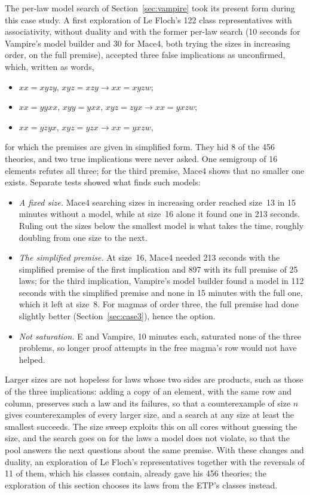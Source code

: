 \documentclass[11pt,a4paper]{article}
\theoremstyle{definition}
\theoremstyle{remark}
\begin{document}
The per-law model search of Section~\ref{sec:vampire} took its present form during this case study. A first exploration of Le Floch's 122 class representatives with associativity, without duality and with the former per-law search (10 seconds for Vampire's model builder and 30 for Mace4, both trying the sizes in increasing order, on the full premise), accepted three false implications as unconfirmed, which, written as words,
\begin{itemize}
  \item $xx = xyzy$, $xyz = xzy \to xx = xyzw$;
  \item $xx = yyxx$, $xyy = yxx$, $xyz = zyx \to xx = yxzw$;
  \item $xx = yzyx$, $xyz = yzx \to xx = yxzw$,
\end{itemize}
for which the premises are given in simplified form. They hid 8 of the 456 theories, and two true implications were never asked. One semigroup of 16 elements refutes all three; for the third premise, Mace4 shows that no smaller one exists. Separate tests showed what finds such models:
\begin{itemize}
  \item \emph{A fixed size.} Mace4 searching sizes in increasing order reached size~13 in 15 minutes without a model, while at size~16 alone it found one in 213 seconds. Ruling out the sizes below the smallest model is what takes the time, roughly doubling from one size to the next.
  \item \emph{The simplified premise.} At size~16, Mace4 needed 213 seconds with the simplified premise of the first implication and 897 with its full premise of 25 laws; for the third implication, Vampire's model builder found a model in 112 seconds with the simplified premise and none in 15 minutes with the full one, which it left at size~8. For magmas of order three, the full premise had done slightly better (Section~\ref{sec:case3}), hence the option.
  \item \emph{Not saturation.} E and Vampire, 10 minutes each, saturated none of the three problems, so longer proof attempts in the free magma's row would not have helped.
\end{itemize}
Larger sizes are not hopeless for laws whose two sides are products, such as those of the three implications: adding a copy of an element, with the same row and column, preserves such a law and its failures, so that a counterexample of size $n$ gives counterexamples of every larger size, and a search at any size at least the smallest succeeds. The size sweep exploits this on all cores without guessing the size, and the search goes on for the laws a model does not violate, so that the pool answers the next questions about the same premise. With these changes and duality, an exploration of Le Floch's representatives together with the reversals of 11 of them, which his classes contain, already gave his 456 theories; the exploration of this section chooses its laws from the ETP's classes instead.
\end{document}
